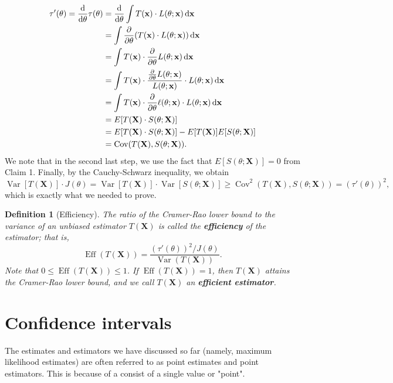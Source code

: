 \documentclass[10pt]{article}
\makeatletter
\newcommand{\dd}{\,{\rm d}}
\DeclareMathOperator{\Var}{Var}
\DeclareMathOperator{\Cov}{Cov}
\DeclareMathOperator{\Eff}{Eff}
\theoremstyle{newstyle}
\newtheorem{defn}[thm]{Definition}
\newenvironment{pf}[1][\proofname]{\par
  \pushQED{\qed}%
  \normalfont \topsep0\p@\relax
  \trivlist
  \item[\hskip\labelsep\scshape
  #1\@addpunct{.}]\ignorespaces
}{%
  \popQED\endtrivlist\@endpefalse
}
\makeatother
\begin{document}
\begin{pf}
\begin{align*}
    \tau'(\theta) = \frac{\rm d}{{\rm d}\theta} \tau(\theta)
    &= \frac{\rm d}{{\rm d}\theta} \int T(\mathbf x) \cdot L(\theta; \mathbf x)\dd\mathbf x \\
    &= \int \frac{\partial}{\partial\theta} (T(\mathbf x) \cdot L(\theta; \mathbf x)) \dd\mathbf x \\
    &= \int T(\mathbf x) \cdot \frac{\partial}{\partial\theta} L(\theta; \mathbf x) \dd \mathbf x \\
    &= \int T(\mathbf x) \cdot \frac{\frac{\partial}{\partial\theta} L(\theta; \mathbf x)}{L(\theta; \mathbf x)} \cdot L(\theta; \mathbf x) \dd \mathbf x \\
    &= \int T(\mathbf x) \cdot \frac{\partial}{\partial\theta} \ell(\theta; \mathbf x) 
    \cdot L(\theta; \mathbf x) \dd \mathbf x \\
    &= E[T(\mathbf X) \cdot S(\theta; \mathbf X)] \\
    &= E[T(\mathbf X) \cdot S(\theta; \mathbf X)] - E[T(\mathbf X)] E[S(\theta; \mathbf X)] \\
    &= \Cov(T(\mathbf X), S(\theta; \mathbf X)). 
\end{align*}
We note that in the second last step, we use the fact that $E[S(\theta; \mathbf X)] = 0$ from 
Claim 1. Finally, by the Cauchy-Schwarz inequality, we obtain 
\[ \Var[T(\mathbf X)] \cdot J(\theta) = \Var[T(\mathbf X)] \cdot 
\Var[S(\theta; \mathbf X)] \geq \Cov^2(T(\mathbf X), S(\theta; \mathbf X)) = (\tau'(\theta))^2, \]
which is exactly what we needed to prove. 
\end{pf}

\begin{defn}[Efficiency]
The ratio of the Cramer-Rao lower bound to the variance of an unbiased estimator $T(\mathbf X)$ is 
called the {\bf efficiency} of the estimator; that is, 
\[ \Eff(T(\mathbf X)) = \frac{(\tau'(\theta))^2/J(\theta)}{\Var(T(\mathbf X))}. \]
Note that $0 \leq \Eff(T(\mathbf X)) \leq 1$. If $\Eff(T(\mathbf X)) = 1$, then $T(\mathbf X)$ 
attains the Cramer-Rao lower bound, and we call $T(\mathbf X)$ an 
{\bf efficient estimator}. 
\end{defn}

\newpage 
\section{Confidence intervals}

The estimates and estimators we have discussed so far (namely, maximum likelihood estimates) 
are often referred to as point estimates and point estimators. This is because of a consist of a 
single value or "point". 
\end{document}

